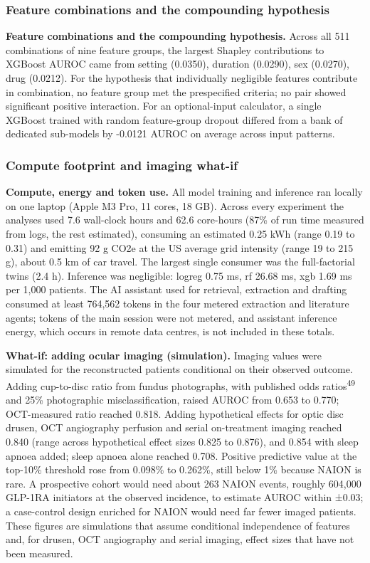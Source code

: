 \documentclass[
  11pt,
]{article}
\begin{document}
\subsubsection{Feature combinations and the compounding
hypothesis}\label{feature-combinations-and-the-compounding-hypothesis}

\textbf{Feature combinations and the compounding hypothesis.} Across all
511 combinations of nine feature groups, the largest Shapley
contributions to XGBoost AUROC came from setting (0.0350), duration
(0.0290), sex (0.0270), drug (0.0212). For the hypothesis that
individually negligible features contribute in combination, no feature
group met the prespecified criteria; no pair showed significant positive
interaction. For an optional-input calculator, a single XGBoost trained
with random feature-group dropout differed from a bank of dedicated
sub-models by -0.0121 AUROC on average across input patterns.

\subsubsection{Compute footprint and imaging
what-if}\label{compute-footprint-and-imaging-what-if}

\textbf{Compute, energy and token use.} All model training and inference
ran locally on one laptop (Apple M3 Pro, 11 cores, 18 GB). Across every
experiment the analyses used 7.6 wall-clock hours and 62.6 core-hours
(87\% of run time measured from logs, the rest estimated), consuming an
estimated 0.25 kWh (range 0.19 to 0.31) and emitting 92 g CO2e at the US
average grid intensity (range 19 to 215 g), about 0.5 km of car travel.
The largest single consumer was the full-factorial twins (2.4 h).
Inference was negligible: logreg 0.75 ms, rf 26.68 ms, xgb 1.69 ms per
1,000 patients. The AI assistant used for retrieval, extraction and
drafting consumed at least 764,562 tokens in the four metered extraction
and literature agents; tokens of the main session were not metered, and
assistant inference energy, which occurs in remote data centres, is not
included in these totals.

\textbf{What-if: adding ocular imaging (simulation).} Imaging values
were simulated for the reconstructed patients conditional on their
observed outcome. Adding cup-to-disc ratio from fundus photographs, with
published odds ratios\textsuperscript{49} and 25\% photographic
misclassification, raised AUROC from 0.653 to 0.770; OCT-measured ratio
reached 0.818. Adding hypothetical effects for optic disc drusen, OCT
angiography perfusion and serial on-treatment imaging reached 0.840
(range across hypothetical effect sizes 0.825 to 0.876), and 0.854 with
sleep apnoea added; sleep apnoea alone reached 0.708. Positive
predictive value at the top-10\% threshold rose from 0.098\% to 0.262\%,
still below 1\% because NAION is rare. A prospective cohort would need
about 263 NAION events, roughly 604,000 GLP-1RA initiators at the
observed incidence, to estimate AUROC within ±0.03; a case-control
design enriched for NAION would need far fewer imaged patients. These
figures are simulations that assume conditional independence of features
and, for drusen, OCT angiography and serial imaging, effect sizes that
have not been measured.
\end{document}
